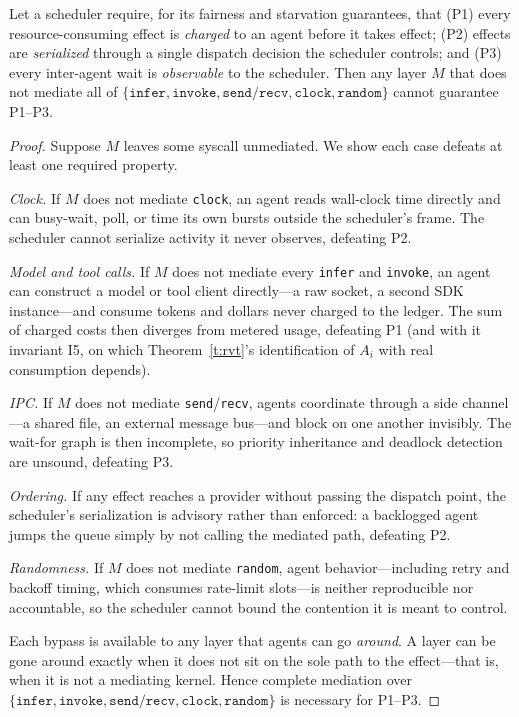 \documentclass[letterpaper,11pt,leqno]{article}
\begin{document}
\begin{proposition}\label{p:mediation}
Let a scheduler require, for its fairness and starvation guarantees, that (P1) every resource-consuming effect is \emph{charged} to an agent before it takes effect; (P2) effects are \emph{serialized} through a single dispatch decision the scheduler controls; and (P3) every inter-agent wait is \emph{observable} to the scheduler. Then any layer $M$ that does not mediate all of $\{\texttt{infer}, \texttt{invoke}, \texttt{send}/\texttt{recv}, \texttt{clock}, \texttt{random}\}$ cannot guarantee P1--P3.
\end{proposition}

\begin{proof}
Suppose $M$ leaves some syscall unmediated. We show each case defeats at least one required property.

\emph{Clock.} If $M$ does not mediate \texttt{clock}, an agent reads wall-clock time directly and can busy-wait, poll, or time its own bursts outside the scheduler's frame. The scheduler cannot serialize activity it never observes, defeating P2.

\emph{Model and tool calls.} If $M$ does not mediate every \texttt{infer} and \texttt{invoke}, an agent can construct a model or tool client directly---a raw socket, a second SDK instance---and consume tokens and dollars never charged to the ledger. The sum of charged costs then diverges from metered usage, defeating P1 (and with it invariant I5, on which Theorem~\ref{t:rvt}'s identification of $A_i$ with real consumption depends).

\emph{IPC.} If $M$ does not mediate \texttt{send}/\texttt{recv}, agents coordinate through a side channel---a shared file, an external message bus---and block on one another invisibly. The wait-for graph is then incomplete, so priority inheritance and deadlock detection are unsound, defeating P3.

\emph{Ordering.} If any effect reaches a provider without passing the dispatch point, the scheduler's serialization is advisory rather than enforced: a backlogged agent jumps the queue simply by not calling the mediated path, defeating P2.

\emph{Randomness.} If $M$ does not mediate \texttt{random}, agent behavior---including retry and backoff timing, which consumes rate-limit slots---is neither reproducible nor accountable, so the scheduler cannot bound the contention it is meant to control.

Each bypass is available to any layer that agents can go \emph{around}. A layer can be gone around exactly when it does not sit on the sole path to the effect---that is, when it is not a mediating kernel. Hence complete mediation over $\{\texttt{infer}, \texttt{invoke}, \texttt{send}/\texttt{recv}, \texttt{clock}, \texttt{random}\}$ is necessary for P1--P3.
\end{proof}
\end{document}
